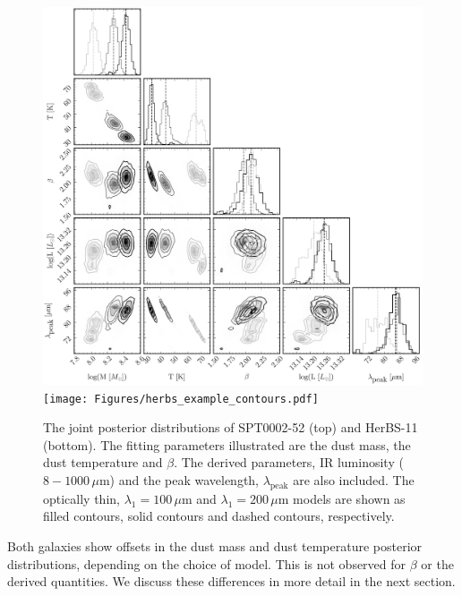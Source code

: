 \begin{figure}
	\centering
	\includegraphics[width=0.7\columnwidth]{Figures/spt_example_contours.pdf}
	\texttt{[image: Figures/herbs\_example\_contours.pdf]}
	\caption[Posterior distributions for SPT0002-52 and HerBS-11]{The joint posterior distributions of SPT0002-52 (top) and HerBS-11 (bottom). The fitting parameters illustrated are the dust mass, the dust temperature and $\beta$. The derived parameters, IR luminosity ($8 - 1000\,\mu$m) and the peak wavelength, $\lambda_\textrm{peak}$ are also included. The optically thin, $\lambda_1 = 100\,\mu$m and $\lambda_1 = 200\,\mu$m models are shown as filled contours, solid contours and dashed contours, respectively.}
	\label{fig:example_SEDs}
\end{figure}

Both galaxies show offsets in the dust mass and dust temperature posterior distributions, depending on the choice of model. This is not observed for $\beta$ or the derived quantities. We discuss these differences in more detail in the next section.

